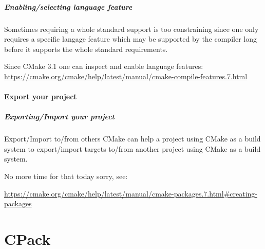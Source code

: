 \documentclass[compress,slidestop,table,usepdftitle=false
              ]
               {beamer}
\begin{document}
\begin{frame}[fragile]
\frametitle{Enabling/selecting language feature}
Sometimes requiring a whole standard support is too constraining since one only requires a specific langage feature
which may be supported by the compiler long before it supports the whole standard requirements.

Since CMake 3.1 one can inspect and enable language features:
\url{https://cmake.org/cmake/help/latest/manual/cmake-compile-features.7.html}
\end{frame}

\subsection{Export your project}
\begin{frame}
\frametitle{Exporting/Import your project}

\begin{block}{Export/Import to/from others}
CMake can help a project using CMake as a build system to
export/import targets to/from another project using CMake
as a build system.
\end{block}

No more time for that today sorry, see:

\url{https://cmake.org/cmake/help/latest/manual/cmake-packages.7.html\#creating-packages}
\end{frame}

\part{CPack}
\end{document}
